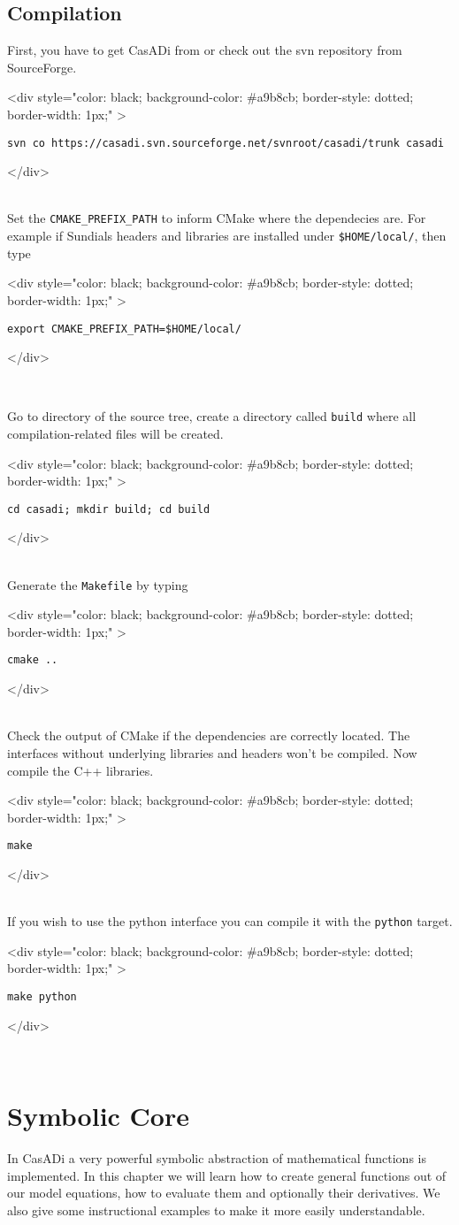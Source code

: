 \documentclass[a4paper,12pt]{book}
\newcommand{\codebegin}{
\begin{rawhtml}
<div style="color: black; background-color: \#a9b8cb;  border-style: dotted; border-width: 1px;" >
\end{rawhtml}
}
\newcommand{\codeend}{
\begin{rawhtml}
</div>
\end{rawhtml}
}
\begin{document}
\section{Compilation}
First, you have to get CasADi from  or check out the svn repository from SourceForge.
\par
\codebegin
\begin{verbatim}
svn co https://casadi.svn.sourceforge.net/svnroot/casadi/trunk casadi
\end{verbatim}
\codeend\\
Set the \texttt{CMAKE_PREFIX_PATH} to inform CMake where the dependecies are. 
For example if Sundials headers and libraries are installed under \texttt{\$HOME/local/}, then type
\par
\codebegin{
\begin{verbatim}
export CMAKE_PREFIX_PATH=$HOME/local/
\end{verbatim}
\codeend\\
\par
Go to directory of the source tree, create a directory called \texttt{build} where all compilation-related files will be created.
\par
\codebegin
\begin{verbatim}
cd casadi; mkdir build; cd build
\end{verbatim}
\codeend\\
Generate the \texttt{Makefile} by typing
\par
\codebegin
\begin{verbatim}
cmake ..
\end{verbatim}
\codeend\\
Check the output of CMake if the dependencies are correctly located. The interfaces without underlying libraries and headers won't be compiled.
Now compile the C++ libraries.
\par
\codebegin
\begin{verbatim}
make
\end{verbatim}
\codeend\\
If you wish to use the python interface you can compile it with the \texttt{python} target.
\par
\codebegin
\begin{verbatim}
make python
\end{verbatim}
\codeend\\

\chapter{Symbolic Core}
In CasADi a very powerful symbolic abstraction of mathematical functions is implemented.
In this chapter we will learn how to create general functions out of our model equations, 
how to evaluate them and optionally their derivatives. We also give some instructional
examples to make it more easily understandable.
}
\end{document}
